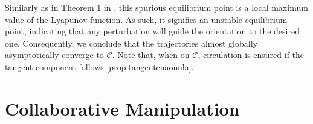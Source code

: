 Similarly as in Theorem 1 in \cite{Culbertson2021}, this spurious equilibrium point is a local maximum value of the Lyapunov function. As such, it signifies an unstable equilibrium point, indicating that any perturbation will guide the orientation to the desired one. Consequently, we conclude that the trajectories almost globally asymptotically converge to $\mathcal{C}$. Note that, when on $\mathcal{C}$, circulation is ensured if the tangent component follows \cref{prop:tangentenaonula}.

\vspace{-1mm}
\section{Collaborative Manipulation}
\vspace{-1mm}

